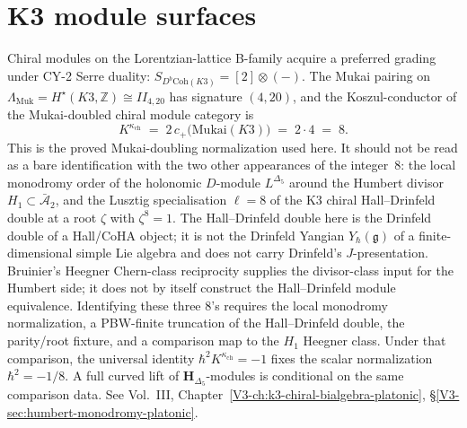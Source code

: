 \section{K3 module surfaces}
\label{sec:chiralmod-supplement}

\begin{remark}[CY-2 $\lbrack 2\rbrack$-shift and Mukai-doubling $K^{\kappa_{\mathrm{ch}}} = 8$]
\label{rem:chiralmod-1}
Chiral modules on the Lorentzian-lattice B-family acquire a preferred
grading under CY-2 Serre duality:
$S_{D^b\mathrm{Coh}(K3)} = [2]\otimes(-)$. The Mukai pairing on
$\Lambda_{\mathrm{Muk}} = H^\star(K3,\mathbb Z) \cong II_{4,20}$ has
signature $(4,20)$, and the Koszul-conductor of the Mukai-doubled chiral
module category is
\[
K^{\kappa_{\mathrm{ch}}} \;=\; 2\, c_+\bigl(\mathrm{Mukai}(K3)\bigr) \;=\; 2\cdot 4 \;=\; 8.
\]
This is the proved Mukai-doubling normalization used here. It should
not be read as a bare identification with the two other appearances of
the integer~$8$: the local monodromy order of the holonomic
$D$-module $L^{\Delta_5}$ around the Humbert divisor
$H_1\subset\bar{\mathcal A}_2$, and the Lusztig specialisation
$\ell=8$ of the K3 chiral Hall--Drinfeld double at a root
$\zeta$ with $\zeta^8=1$. The Hall--Drinfeld double here is the
Drinfeld double of a Hall/CoHA object; it is not the Drinfeld Yangian
$Y_\hbar(\mathfrak g)$ of a finite-dimensional simple Lie algebra and
does not carry Drinfeld's $J$-presentation. Bruinier's Heegner
Chern-class reciprocity supplies the divisor-class input for the
Humbert side; it does not by itself construct the Hall--Drinfeld
module equivalence. Identifying these three $8$'s requires the local
monodromy normalization, a PBW-finite truncation of the
Hall--Drinfeld double, the parity/root fixture, and a comparison map
to the $H_1$ Heegner class. Under that comparison, the universal identity
$\hbar^2 K^{\kappa_{\mathrm{ch}}}=-1$ fixes the scalar normalization
$\hbar^2=-1/8$. A full curved lift of
$\mathbf H_{\Delta_5}$-modules is conditional on the same comparison
data.
See Vol.~III, Chapter~\ref{V3-ch:k3-chiral-bialgebra-platonic}, \S\ref{V3-sec:humbert-monodromy-platonic}.
\end{remark}

